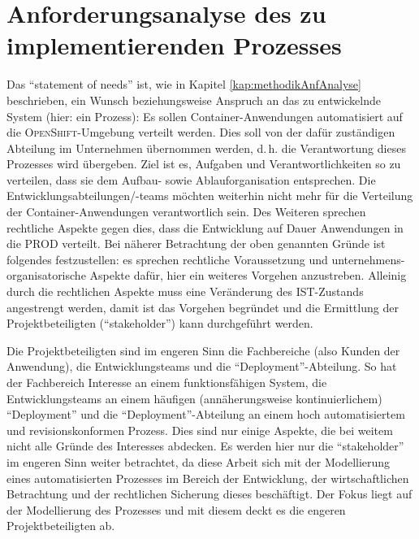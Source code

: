 \section{Anforderungsanalyse des zu implementierenden Prozesses}
Das \enquote{statement of needs} ist, wie in Kapitel \vref{kap:methodikAnfAnalyse} beschrieben, ein Wunsch beziehungsweise Anspruch an das zu entwickelnde System (hier: ein Prozess): Es sollen Container-Anwendungen automatisiert auf die \textsc{OpenShift}-Umgebung verteilt werden. Dies soll von der dafür zuständigen Abteilung im Unternehmen übernommen werden, d.\,h. die Verantwortung dieses Prozesses wird übergeben. Ziel ist es, Aufgaben und Verantwortlichkeiten so zu verteilen, dass sie dem Aufbau- sowie Ablauforganisation entsprechen. Die Entwicklungsabteilungen/-teams möchten weiterhin nicht mehr für die Verteilung der Container-Anwendungen verantwortlich sein. Des Weiteren sprechen rechtliche Aspekte gegen dies, dass die Entwicklung auf Dauer Anwendungen in die \ac{PROD} verteilt. Bei näherer Betrachtung der oben genannten Gründe ist folgendes festzustellen: es sprechen rechtliche Voraussetzung und unternehmens-organisatorische Aspekte dafür, hier ein weiteres Vorgehen anzustreben. Alleinig durch die rechtlichen Aspekte muss eine Veränderung des IST-Zustands angestrengt werden, damit ist das Vorgehen begründet und die Ermittlung der Projektbeteiligten (\enquote{stakeholder}) kann durchgeführt werden.
\par
Die Projektbeteiligten sind im engeren Sinn die Fachbereiche (also Kunden der Anwendung), die Entwicklungsteams und die \enquote{Deployment}-Abteilung. So hat der Fachbereich Interesse an einem funktionsfähigen System, die Entwicklungsteams an einem häufigen (annäherungsweise kontinuierlichem) \enquote{Deployment} und die \enquote{Deployment}-Abteilung an einem hoch automatisiertem und revisionskonformen Prozess. Dies sind nur einige Aspekte, die bei weitem nicht alle Gründe des Interesses abdecken. Es werden hier nur die \enquote{stakeholder} im engeren Sinn weiter betrachtet, da diese Arbeit sich mit der Modellierung eines automatisierten Prozesses im Bereich der Entwicklung, der wirtschaftlichen Betrachtung und der rechtlichen Sicherung dieses beschäftigt. Der Fokus liegt auf der Modellierung des Prozesses und mit diesem deckt es die engeren Projektbeteiligten ab. 
\par
